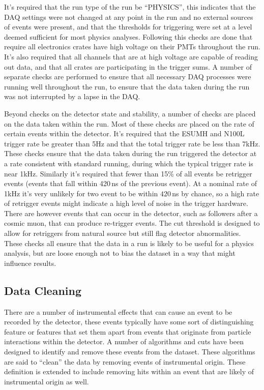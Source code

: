 It's required that the run type of the run be ``PHYSICS'', this indicates
that the DAQ settings were not changed at any point in the run and no external
sources of events were present, and that the thresholds for triggering were set
at a level deemed sufficient for most physics analyses.
Following this checks are done
that require all electronics crates have high voltage on their PMTs throughout
the run.
It's also required that all channels that are at high voltage are capable of
reading out data, and that all crates are participating in the trigger sums.
A number of separate checks are performed to ensure that all necessary DAQ
processes were running well throughout the run, to ensure that the data taken
during the run was not interrupted by a lapse in the DAQ.\@

Beyond checks on the detector state and stability, a number of checks
are placed on the data taken within the run.
Most of these checks are placed on the rate of certain events within the detector.
It's required that the ESUMH and N100L trigger rate be greater than 5Hz and
that the total trigger rate be less than 7kHz.
These checks ensure that the data taken during the run triggered the detector
at a rate consistent with standard running, during which the typical trigger
rate is near 1kHz.
Similarly it's required that fewer than 15\% of all events be retrigger events
(events that fall within 420\,ns of the previous event).
At a nominal rate of 1kHz it's very unlikely for two event to be within $420$\,ns
by chance, so a high rate of retrigger events might indicate a high level
of noise in the trigger hardware. There are however events that can occur
in the detector, such as followers after a cosmic muon, that can produce
re-trigger events.
The cut threshold is designed to allow for retriggers from natural source but
still flag detector abnormalities.
These checks all ensure that the data in a run is likely to be useful for
a physics analysis, but are loose enough not to bias the dataset in a way that
might influence results.

\subsection{Data Cleaning}
There are a number of instrumental effects that can cause an event
to be recorded by the detector, these events typically have some
sort of distinguishing feature or features that set them apart
from events that originate from particle interactions within the
detector.
A number of algorithms and cuts have been designed to identify and remove
these events from the dataset.
These algorithms are said to ``clean'' the data by removing events
of instrumental origin. These definition is extended to include removing
hits within an event that are likely of instrumental origin as well.

